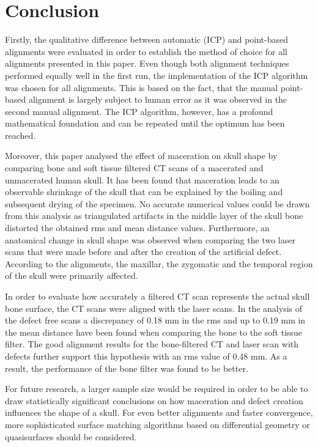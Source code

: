 \documentclass[a4paper]{article}
\begin{document}
\section{Conclusion} %
Firstly, the qualitative difference between automatic (ICP) and point-based alignments were evaluated in order to establish the method of choice for all alignments presented in this paper. Even though both alignment techniques performed equally well in the first run, the implementation of the ICP algorithm was chosen for all alignments. This is based on the fact, that the manual point-based alignment is largely subject to human error as it was observed in the second manual alignment. The ICP algorithm, however, has a profound mathematical foundation and can be repeated until the optimum has been reached.

Moreover, this paper analysed the effect of maceration on skull shape by comparing bone and soft tissue filtered CT scans of a macerated and unmacerated human skull. It has been found that maceration leads to an observable shrinkage of the skull that can be explained by the boiling and subsequent drying of the specimen. No accurate numerical values could be drawn from this analysis as triangulated artifacts in the middle layer of the skull bone distorted the obtained rms and mean distance values. Furthermore, an anatomical change in skull shape was observed when comparing the two laser scans that were made before and after the creation of the artificial defect. According to the alignments, the maxillar, the zygomatic and the temporal region of the skull were primarily affected.

In order to evaluate how accurately a filtered CT scan represents the actual skull bone surface, the CT scans were aligned with the laser scans. In the analysis of the defect free scans a discrepancy of 0.18 mm in the rms and up to 0.19 mm in the mean distance have been found when comparing the bone to the soft tissue filter. The good alignment results for the bone-filtered CT and laser scan with defects further support this hypothesis with an rms value of 0.48 mm. As a result, the performance of the bone filter was found to be better.

For future research, a larger sample size would be required in order to be able to draw statistically significant conclusions on how maceration and defect creation influences the shape of a skull. For even better alignments and faster convergence, more sophisticated surface matching algorithms based on differential geometry or quasisurfaces should be considered.
\end{document}
